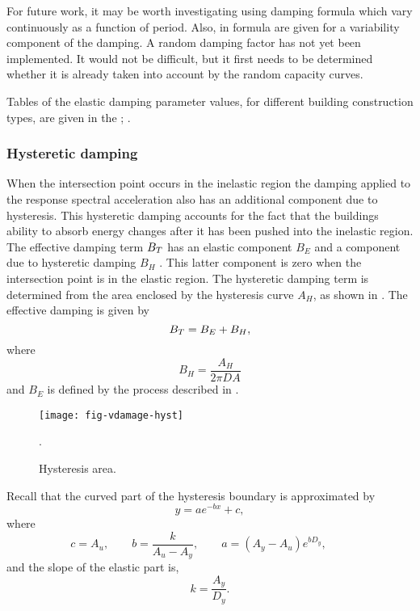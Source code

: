 For future work, it may be worth investigating using damping
formula which vary continuously as a function of period. Also, in
\cite{Newmark82} formula are given for a variability component of
the damping. A random damping factor has not yet been implemented.
It would not be difficult, but it first needs to be determined
whether it is already taken into account by the random capacity
curves.

Tables of the elastic damping parameter values, for different
building construction types, are given in the
; .


\subsubsection{Hysteretic damping}
\label{sec:dam-hystericdamping}

When the intersection point occurs in the inelastic region the
damping applied to the response spectral
acceleration also has an
additional component due to hysteresis. This hysteretic damping
accounts for the fact that the buildings ability to absorb energy
changes after it has been pushed into the inelastic region. The
effective damping term $\Beff$ has an
elastic component $B_E$ and a component due to hysteretic damping
$B_H$ . This latter component is zero when the intersection point
is in the elastic region. The hysteretic damping term is
determined from the area enclosed by the hysteresis curve $A_H$,
as shown in . The effective
damping is given by
\begin{equation}
\Beff = B_E + B_H,
\end{equation}
where
\begin{equation}
B_H = \frac{A_H}{2\pi DA}
\end{equation}
and $B_E$ is defined by the process described in
.
\begin{figure}
\centering
{}
\texttt{[image: fig-vdamage-hyst]}
\caption{Hysteresis area.}
\label{fig:vdamage-hystarea}.
\end{figure}

Recall that the curved part of the hysteresis boundary is
approximated by
$$
 y = ae^{-bx}+c,
$$
where
$$
 c = A_u, \qquad
 b = \frac{k}{A_u-A_y}, \qquad
 a = (A_y-A_u)e^{b D_y}, \qquad
$$
and the slope of the elastic part is,
$$
 k = \frac{A_y}{D_y}.
$$

